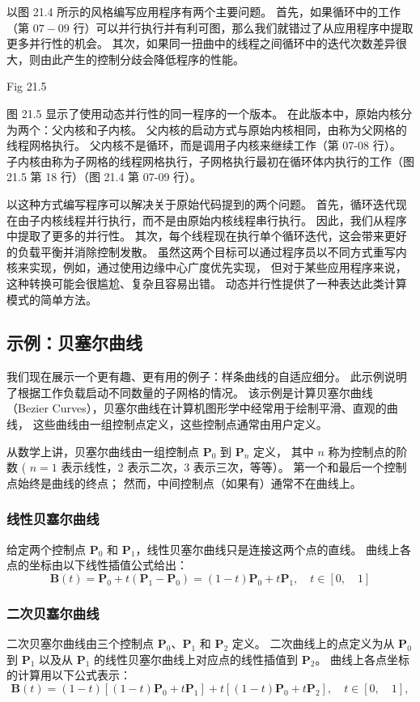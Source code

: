 以图 21.4 所示的风格编写应用程序有两个主要问题。 
首先，如果循环中的工作（第 $07-09$ 行）可以并行执行并有利可图，那么我们就错过了从应用程序中提取更多并行性的机会。 
其次，如果同一扭曲中的线程之间循环中的迭代次数差异很大，则由此产生的控制分歧会降低程序的性能。

{\color{red} Fig 21.5}

图 21.5 显示了使用动态并行性的同一程序的一个版本。 在此版本中，原始内核分为两个：父内核和子内核。 
父内核的启动方式与原始内核相同，由称为父网格的线程网格执行。 父内核不是循环，而是调用子内核来继续工作（第 07-08 行）。 
子内核由称为子网格的线程网格执行，子网格执行最初在循环体内执行的工作（图 21.5 第 18 行）（图 21.4 第 07-09 行）。

以这种方式编写程序可以解决关于原始代码提到的两个问题。 
首先，循环迭代现在由子内核线程并行执行，而不是由原始内核线程串行执行。 因此，我们从程序中提取了更多的并行性。 
其次，每个线程现在执行单个循环迭代，这会带来更好的负载平衡并消除控制发散。 
虽然这两个目标可以通过程序员以不同方式重写内核来实现，例如，通过使用边缘中心广度优先实现，
但对于某些应用程序来说，这种转换可能会很尴尬、复杂且容易出错。 动态并行性提供了一种表达此类计算模式的简单方法。

\subsection{示例：贝塞尔曲线}
我们现在展示一个更有趣、更有用的例子：样条曲线的自适应细分。 此示例说明了根据工作负载启动不同数量的子网格的情况。 
该示例是计算贝塞尔曲线（Bezier Curves），贝塞尔曲线在计算机图形学中经常用于绘制平滑、直观的曲线，
这些曲线由一组控制点定义，这些控制点通常由用户定义。

从数学上讲，贝塞尔曲线由一组控制点 $\mathbf{P}_{0}$ 到 $\mathbf{P}_{n}$ 定义，
其中 $n$ 称为控制点的阶数 ( $n =1$ 表示线性，2 表示二次，3 表示三次，等等）。 
第一个和最后一个控制点始终是曲线的终点； 然而，中间控制点（如果有）通常不在曲线上。

\subsubsection{线性贝塞尔曲线}
给定两个控制点 $\mathbf{P}_{0}$ 和 $\mathbf{P}_{1}$，线性贝塞尔曲线只是连接这两个点的直线。 
曲线上各点的坐标由以下线性插值公式给出：
$$
\mathbf{B}(t)=\mathbf{P}_{0}+t\left(\mathbf{P}_{1}-\mathbf{P}_{0}\right)=(1-t ) \mathbf{P}_{0}+t \mathbf{P}_{1}, \quad t \in[0, \quad 1]
$$

\subsubsection{二次贝塞尔曲线}
二次贝塞尔曲线由三个控制点 $\mathbf{P}_{0}、\mathbf{P}_{1}$ 和 $\mathbf{P}_{2}$ 定义。 
二次曲线上的点定义为从 $\mathbf{P}_{0}$ 到 $\mathbf{P}_{1}$ 
以及从 $\mathbf{P}_{1}$ 的线性贝塞尔曲线上对应点的线性插值到 $\mathbf{P}_{2}$。 曲线上各点坐标的计算用以下公式表示：
$$
\mathbf{B}(t)=(1-t)\left[(1-t) \mathbf{P}_{0}+t \mathbf{P}_{1}\right]+t\left[ (1-t) \mathbf{P}_{0}+t \mathbf{P}_{2}\right], \quad t \in[0, \quad 1],
$$

